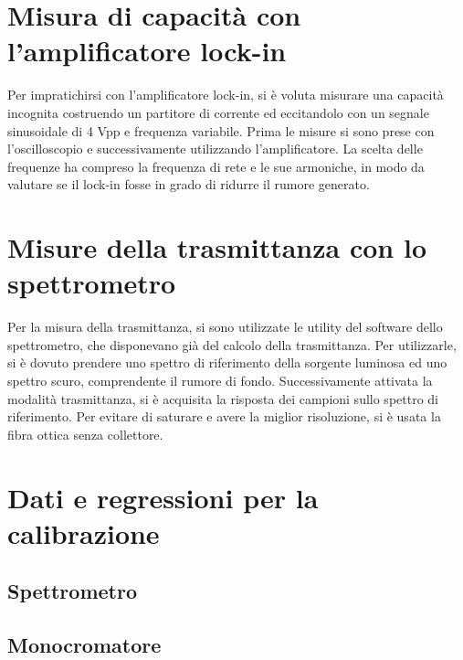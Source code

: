 \documentclass[11pt]{article} %
\begin{document}
\appendix
\section{Misura di capacità con l'amplificatore lock-in}
Per impratichirsi con l'amplificatore lock-in, si è voluta misurare una capacità incognita costruendo un partitore di corrente ed eccitandolo con un segnale sinusoidale di 4 Vpp e frequenza variabile. Prima le misure si sono prese con l'oscilloscopio e successivamente utilizzando l'amplificatore. La scelta delle frequenze ha compreso la frequenza di rete e le sue armoniche, in modo da valutare se il lock-in fosse in grado di ridurre il rumore generato.
\section{Misure della trasmittanza con lo spettrometro}
Per la misura della trasmittanza, si sono utilizzate le utility del software dello spettrometro, che disponevano già del calcolo della trasmittanza. Per utilizzarle, si è dovuto prendere uno spettro di riferimento della sorgente luminosa ed uno spettro scuro, comprendente il rumore di fondo. Successivamente attivata la modalità trasmittanza, si è acquisita la risposta dei campioni sullo spettro di riferimento. Per evitare di saturare e avere la miglior risoluzione, si è usata la fibra ottica senza collettore.
\section{Dati e regressioni per la calibrazione}
\subsection{Spettrometro}
\subsection{Monocromatore}
\end{document}
